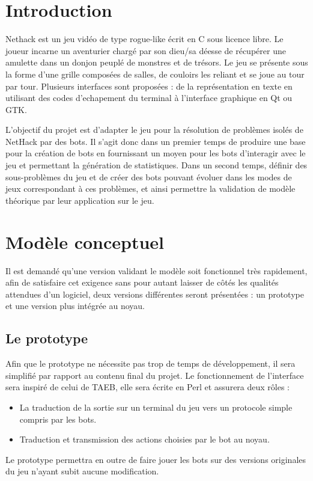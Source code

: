 \documentclass[12pt]{article}
\begin{document}
\section{Introduction}

Nethack est un jeu vidéo de type rogue-like écrit en C sous licence libre. Le joueur incarne un aventurier chargé par son dieu/sa déesse de récupérer une amulette dans un donjon peuplé de monstres et de trésors. Le jeu se présente sous la forme d'une grille composées de salles, de couloirs les reliant et se joue au tour par tour. Plusieurs interfaces sont proposées : de la représentation en texte en utilisant des codes d'echapement du terminal à l'interface graphique en Qt ou GTK.

L'objectif du projet est d'adapter le jeu pour la résolution de problèmes
isolés de NetHack par des bots. Il s'agit donc dans un premier temps de produire une base pour la
création de bots en fournissant un moyen pour les bots d'interagir avec le jeu
et permettant la génération de statistiques. Dans un second temps, définir des sous-problèmes du jeu et de créer des bots pouvant évoluer dans les modes de jeux correspondant à ces problèmes, et ainsi permettre la validation de modèle théorique par leur application sur le jeu.


\section{Modèle conceptuel}

Il est demandé qu'une version validant le modèle soit fonctionnel très rapidement, afin de satisfaire cet exigence sans pour autant laisser de côtés les qualités attendues d'un logiciel, deux versions différentes seront présentées : un prototype et une version plus intégrée au noyau.

\subsection{Le prototype}
Afin que le prototype ne nécessite pas trop de temps de développement, il sera simplifié par rapport au contenu final du projet. Le fonctionnement de l'interface sera inspiré de celui de TAEB, elle sera écrite en Perl et assurera deux rôles :
\begin{itemize}
\item La traduction de la sortie sur un terminal du jeu vers un protocole
simple compris par les bots.
\item Traduction et transmission des actions choisies par le bot au noyau.
\end{itemize}
Le prototype permettra en outre de faire jouer les bots sur des versions
originales du jeu n'ayant subit aucune modification.
\end{document}
